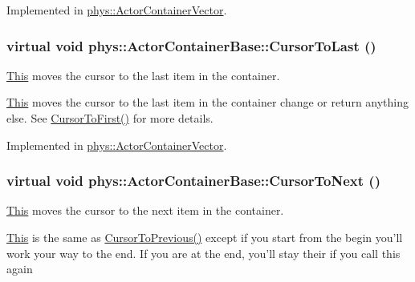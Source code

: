 Implemented in \hyperlink{classphys_1_1ActorContainerVector_ad9c2eb2a9405dcf687c86745afc9c031}{phys::ActorContainerVector}.

\hypertarget{classphys_1_1ActorContainerBase_afad072e018a04c190e5e5fb93b82b354}{
\subsubsection[{CursorToLast}]{\setlength{\rightskip}{0pt plus 5cm}virtual void phys::ActorContainerBase::CursorToLast ()}}
\label{d1/d00/classphys_1_1ActorContainerBase_afad072e018a04c190e5e5fb93b82b354}


\hyperlink{structThis}{This} moves the cursor to the last item in the container. 

\hyperlink{structThis}{This} moves the cursor to the last item in the container change or return anything else. See \hyperlink{classphys_1_1ActorContainerBase_ab1a44758d7c17e70ff2e0f8de47424c3}{CursorToFirst()} for more details. 

Implemented in \hyperlink{classphys_1_1ActorContainerVector_aa6b08266bbb57a22c07ab50514e58db4}{phys::ActorContainerVector}.

\hypertarget{classphys_1_1ActorContainerBase_a1aa337456a4e74cb5740dbae08778072}{
\subsubsection[{CursorToNext}]{\setlength{\rightskip}{0pt plus 5cm}virtual void phys::ActorContainerBase::CursorToNext ()}}
\label{d1/d00/classphys_1_1ActorContainerBase_a1aa337456a4e74cb5740dbae08778072}


\hyperlink{structThis}{This} moves the cursor to the next item in the container. 

\hyperlink{structThis}{This} is the same as \hyperlink{classphys_1_1ActorContainerBase_a7c424168c0bbd973b283a083714123b3}{CursorToPrevious()} except if you start from the begin you'll work your way to the end. If you are at the end, you'll stay their if you call this again 

